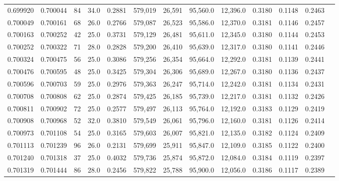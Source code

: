 \begin{tabular}{rrrrrrrrrrrrr}
0.699920 & 0.700044 &    84 & 34.0 &                                     0.2881 & 579,019 &  26,591 &  95,560.0 &  12,396.0 & 0.3180 & 0.1148 & 0.2463 \\
0.700049 & 0.700161 &    68 & 26.0 &                                     0.2766 & 579,087 &  26,523 &  95,586.0 &  12,370.0 & 0.3181 & 0.1146 & 0.2457 \\
0.700163 & 0.700252 &    42 & 25.0 &                                     0.3731 & 579,129 &  26,481 &  95,611.0 &  12,345.0 & 0.3180 & 0.1144 & 0.2453 \\
0.700252 & 0.700322 &    71 & 28.0 &                                     0.2828 & 579,200 &  26,410 &  95,639.0 &  12,317.0 & 0.3180 & 0.1141 & 0.2446 \\
0.700324 & 0.700475 &    56 & 25.0 &                                     0.3086 & 579,256 &  26,354 &  95,664.0 &  12,292.0 & 0.3181 & 0.1139 & 0.2441 \\
0.700476 & 0.700595 &    48 & 25.0 &                                     0.3425 & 579,304 &  26,306 &  95,689.0 &  12,267.0 & 0.3180 & 0.1136 & 0.2437 \\
0.700596 & 0.700703 &    59 & 25.0 &                                     0.2976 & 579,363 &  26,247 &  95,714.0 &  12,242.0 & 0.3181 & 0.1134 & 0.2431 \\
0.700708 & 0.700808 &    62 & 25.0 &                                     0.2874 & 579,425 &  26,185 &  95,739.0 &  12,217.0 & 0.3181 & 0.1132 & 0.2426 \\
0.700811 & 0.700902 &    72 & 25.0 &                                     0.2577 & 579,497 &  26,113 &  95,764.0 &  12,192.0 & 0.3183 & 0.1129 & 0.2419 \\
0.700908 & 0.700968 &    52 & 32.0 &                                     0.3810 & 579,549 &  26,061 &  95,796.0 &  12,160.0 & 0.3181 & 0.1126 & 0.2414 \\
0.700973 & 0.701108 &    54 & 25.0 &                                     0.3165 & 579,603 &  26,007 &  95,821.0 &  12,135.0 & 0.3182 & 0.1124 & 0.2409 \\
0.701113 & 0.701239 &    96 & 26.0 &                                     0.2131 & 579,699 &  25,911 &  95,847.0 &  12,109.0 & 0.3185 & 0.1122 & 0.2400 \\
0.701240 & 0.701318 &    37 & 25.0 &                                     0.4032 & 579,736 &  25,874 &  95,872.0 &  12,084.0 & 0.3184 & 0.1119 & 0.2397 \\
0.701319 & 0.701444 &    86 & 28.0 &                                     0.2456 & 579,822 &  25,788 &  95,900.0 &  12,056.0 & 0.3186 & 0.1117 & 0.2389 \\

\end{tabular}
